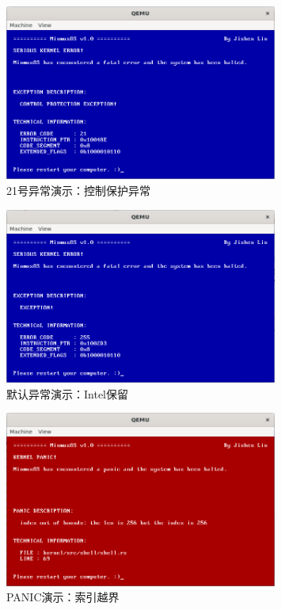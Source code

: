 \begin{figure}[htbp]
    \centering
    \includegraphics[width=0.8\textwidth]{figures/Exception21Presentation.png}
    \caption{21号异常演示：控制保护异常}
\end{figure}

\begin{figure}[htbp]
    \centering
    \includegraphics[width=0.8\textwidth]{figures/ExceptionHandlerPresentation.png}
    \caption{默认异常演示：Intel保留}
\end{figure}

\begin{figure}[htbp]
    \centering
    \includegraphics[width=0.8\textwidth]{figures/PanicHandlerPresentation.png}
    \caption{PANIC演示：索引越界}
\end{figure}

